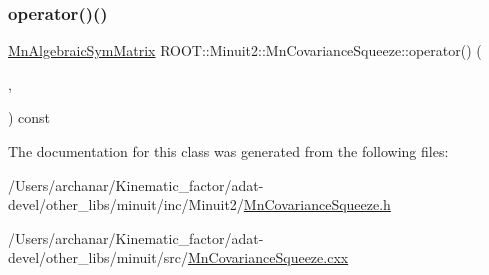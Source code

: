 \subsubsection{\texorpdfstring{operator()()}{operator()()}\hspace{0.1cm}{\footnotesize\ttfamily [9/9]}}
{\footnotesize\ttfamily \mbox{\hyperlink{namespaceROOT_1_1Minuit2_a9e74ad97f5537a2e80e52b04d98ecc6e}{Mn\+Algebraic\+Sym\+Matrix}} R\+O\+O\+T\+::\+Minuit2\+::\+Mn\+Covariance\+Squeeze\+::operator() (\begin{DoxyParamCaption}\item[{const \mbox{\hyperlink{namespaceROOT_1_1Minuit2_a9e74ad97f5537a2e80e52b04d98ecc6e}{Mn\+Algebraic\+Sym\+Matrix}} \&}]{,  }\item[{unsigned int}]{ }\end{DoxyParamCaption}) const}



The documentation for this class was generated from the following files\+:\begin{DoxyCompactItemize}
\item 
/\+Users/archanar/\+Kinematic\+\_\+factor/adat-\/devel/other\+\_\+libs/minuit/inc/\+Minuit2/\mbox{\hyperlink{adat-devel_2other__libs_2minuit_2inc_2Minuit2_2MnCovarianceSqueeze_8h}{Mn\+Covariance\+Squeeze.\+h}}\item 
/\+Users/archanar/\+Kinematic\+\_\+factor/adat-\/devel/other\+\_\+libs/minuit/src/\mbox{\hyperlink{adat-devel_2other__libs_2minuit_2src_2MnCovarianceSqueeze_8cxx}{Mn\+Covariance\+Squeeze.\+cxx}}\end{DoxyCompactItemize}
